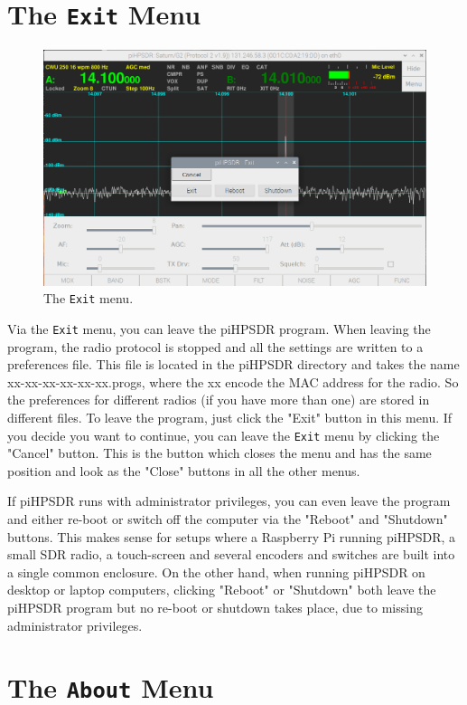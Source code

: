 \documentclass[12pt]{book}
\begin{document}
\section{The \texttt{Exit} Menu}

\begin{figure}[h]
\center
\includegraphics[width=12cm]{ExitMenu.png}
\caption{The \texttt{Exit} menu.}
\end{figure}

Via the \texttt{Exit} menu, you can leave the piHPSDR program. When leaving the program,
the radio protocol is stopped and all the settings are written to a preferences file. This
file is located in the piHPSDR directory and takes the name xx-xx-xx-xx-xx-xx.progs, where
the xx encode the MAC address for the radio. So the preferences for different radios (if you
have more than one) are stored in different files. To leave the program, just click the
"Exit" button in this menu. If you decide you want to continue, you can leave the \texttt{Exit}
menu by clicking the "Cancel" button. This is the button which closes the menu and has
the same position and look as the "Close" buttons in all the other menus.

If piHPSDR runs with administrator privileges, you can even leave the program and either re-boot
or switch off the computer via the "Reboot" and "Shutdown" buttons. This makes sense for setups 
where a Raspberry Pi running piHPSDR, a small SDR radio, a touch-screen and several encoders
and switches are built into a single common enclosure. On the other hand, when running
piHPSDR on desktop or laptop computers, clicking "Reboot" or "Shutdown" both leave the piHPSDR
program but no re-boot or shutdown takes place, due to missing administrator privileges.

\section{The \texttt{About} Menu}
\end{document}
